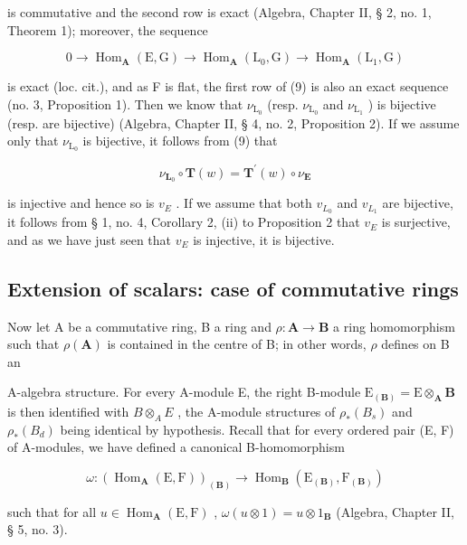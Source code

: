 is commutative and the second row is exact (Algebra, Chapter II, § 2, no. 1, Theorem 1); moreover, the sequence

\[
0 \rightarrow \operatorname{Hom} _ {\mathbf {A}} (\mathrm{E}, \mathrm{G}) \rightarrow \operatorname{Hom} _ {\mathbf {A}} (\mathrm{L} _ {0}, \mathrm{G}) \rightarrow \operatorname{Hom} _ {\mathbf {A}} (\mathrm{L} _ {1}, \mathrm{G})
\]

is exact (loc. cit.), and as F is flat, the first row of (9) is also an exact sequence (no. 3, Proposition 1). Then we know that \(\nu_{\mathrm{L}_0}\) (resp. \(\nu_{\mathrm{L}_0}\) and \(\nu_{\mathrm{L}_1}\) ) is bijective (resp. are bijective) (Algebra, Chapter II, § 4, no. 2, Proposition 2). If we assume only that \(\nu_{\mathrm{L}_0}\) is bijective, it follows from (9) that

\[
\nu_ {\mathbf {L} _ {0}} \circ \mathbf {T} (w) = \mathbf {T} ^ {\prime} (w) \circ \nu_ {\mathbf {E}}
\]

is injective and hence so is \(v_{E}\) . If we assume that both \(v_{L_{0}}\) and \(v_{L_{1}}\) are bijective, it follows from § 1, no. 4, Corollary 2, (ii) to Proposition 2 that \(v_{E}\) is surjective, and as we have just seen that \(v_{E}\) is injective, it is bijective.

\subsection{Extension of scalars: case of commutative rings}

Now let A be a commutative ring, B a ring and \(\rho: \mathbf{A} \to \mathbf{B}\) a ring homomorphism such that \(\rho(\mathbf{A})\) is contained in the centre of B; in other words, \(\rho\) defines on B an

A-algebra structure. For every A-module E, the right B-module \(\mathrm{E}_{(\mathbf{B})} = \mathrm{E} \otimes_{\mathbf{A}} \mathbf{B}\) is then identified with \(B \otimes_{A} E\) , the A-module structures of \(\rho_{*}(B_{s})\) and \(\rho_{*}(B_{d})\) being identical by hypothesis. Recall that for every ordered pair (E, F) of A-modules, we have defined a canonical B-homomorphism

\[
\omega : \left(\operatorname{Hom} _ {\mathbf {A}} (\mathrm{E}, \mathrm{F})\right) _ {(\mathbf {B})} \rightarrow \operatorname{Hom} _ {\mathbf {B}} \left(\mathrm{E} _ {(\mathbf {B})}, \mathrm{F} _ {(\mathbf {B})}\right)\tag{10}
\]

such that for all \(u \in \operatorname{Hom}_{\mathbf{A}}(\mathrm{E}, \mathrm{F})\) , \(\omega(u \otimes 1) = u \otimes 1_{\mathbf{B}}\) (Algebra, Chapter II, § 5, no. 3).

